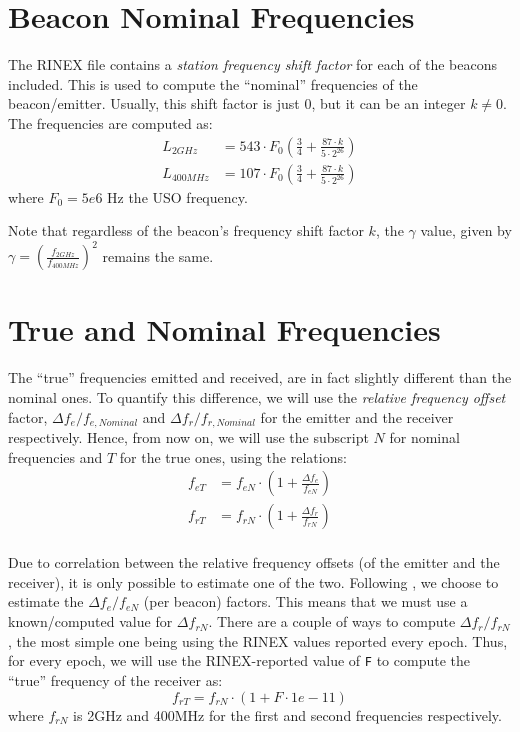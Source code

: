 \section{Beacon Nominal Frequencies}
\label{sec:beacon-nominal-frequencies}
The RINEX file contains a \emph{station frequency shift factor} for each of the 
beacons included. This is used to compute the ``nominal'' frequencies of the 
beacon/emitter. Usually, this shift factor is just $0$, but it can be an integer 
$k \neq 0$. The frequencies are computed as:
\begin{equation}
  \begin{aligned}
    L_{2GHz}   &= 543 \cdot F_0 \left( \frac{3}{4} + \frac{87\cdot k}{5 \cdot 2^{26}} \right) \\
    L_{400MHz} &= 107 \cdot F_0 \left( \frac{3}{4} + \frac{87\cdot k}{5 \cdot 2^{26}} \right) 
  \end{aligned}
\end{equation}
where $F_0 = 5e6 \text{ Hz}$ the USO frequency.

Note that regardless of the beacon's frequency shift factor $k$, the $\gamma$ 
value, given by $\gamma = \left( \frac{f_{2GHz}}{f_{400MHz}} \right) ^2$ remains 
the same.

\section{True and Nominal Frequencies}
\label{sec:true-nominal-frequencies}
The ``true'' frequencies emitted and received, are in fact slightly different 
than the nominal ones. To quantify this difference, we will use the 
\emph{relative frequency offset} factor, $\Delta f_e / f_{e,Nominal}$ and 
$\Delta f_r / f_{r,Nominal}$ for the emitter and the receiver respectively. 
Hence, from now on, we will use the subscript $N$ for nominal frequencies and 
$T$ for the true ones, using the relations:
\begin{equation}
  \begin{aligned}
    f_{eT} &= f_{eN} \cdot \left( 1 + \frac{\Delta f_e}{f_{eN}} \right) \\
    f_{rT} &= f_{rN} \cdot \left( 1 + \frac{\Delta f_r}{f_{rN}} \right) \\
  \end{aligned}
\end{equation}

Due to correlation between the relative frequency offsets (of the emitter and 
the receiver), it is only possible to estimate one of the two. Following 
\cite{lemoine-2016}, we choose to estimate the $\Delta f_e / f_{eN}$ (per beacon) 
factors. This means that we must use a known/computed value for $\Delta f_{rN}$. 
{\color{brown}There are a couple of ways to compute $\Delta f_r / f_{rN}$, 
the most simple one being using the RINEX values reported every epoch.}
Thus, for every epoch, we will use the RINEX-reported value of \texttt{F} to 
compute the ``true'' frequency of the receiver as:
\begin{equation}
  f_{rT} = f_{rN} \cdot \left( 1 + F \cdot 1e-11 \right)
\end{equation}
where $f_{rN}$ is 2GHz and 400MHz for the first and second frequencies 
respectively.

